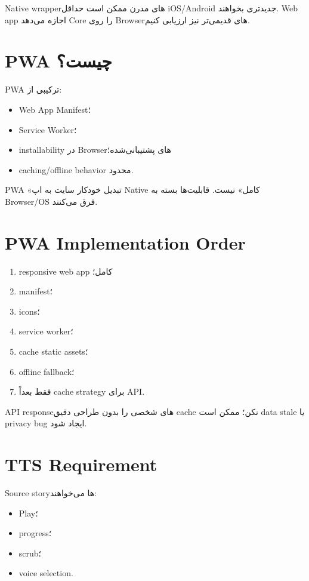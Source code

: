 Native wrapperهای مدرن ممکن است حداقل iOS/Android جدیدتری بخواهند. Web app اجازه می‌دهد Core را روی Browserهای قدیمی‌تر نیز ارزیابی کنیم.

\section{PWA چیست؟}

PWA ترکیبی از:
\begin{itemize}
  \item Web App Manifest؛
  \item Service Worker؛
  \item installability در Browserهای پشتیبانی‌شده؛
  \item caching/offline behavior محدود.
\end{itemize}

\begin{learningbox}
PWA «تبدیل خودکار سایت به اپ Native کامل» نیست. قابلیت‌ها بسته به Browser/OS فرق می‌کنند.
\end{learningbox}

\section{PWA Implementation Order}

\begin{enumerate}
  \item responsive web app کامل؛
  \item manifest؛
  \item icons؛
  \item service worker؛
  \item cache static assets؛
  \item offline fallback؛
  \item فقط بعداً cache strategy برای API.
\end{enumerate}

\begin{warningbox}
API responseهای شخصی را بدون طراحی دقیق cache نکن؛ ممکن است data stale یا privacy bug ایجاد شود.
\end{warningbox}

\section{TTS Requirement}

Source storyها می‌خواهند:
\begin{itemize}
  \item Play؛
  \item progress؛
  \item scrub؛
  \item voice selection.
\end{itemize}

